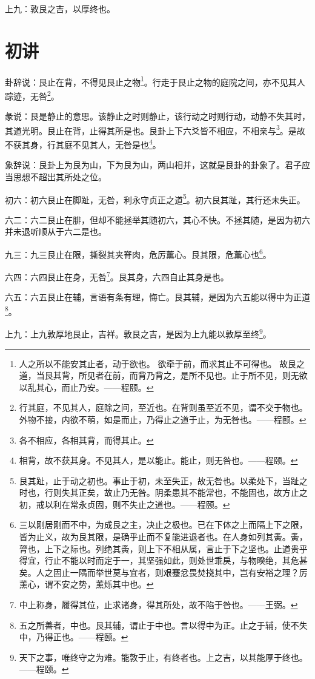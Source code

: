 \documentclass[12pt,oneside]{book}
\begin{document}
上九：敦艮之吉，以厚终也。

\section{初讲}
卦辞说：艮止在背，不得见艮止之物\footnote{人之所以不能安其止者，动于欲也。 欲牵于前，而求其止不可得也。 故艮之道，当艮其背，所见者在前，而背乃背之，是所不见也。止于所不见，则无欲以乱其心，而止乃安。——程颐。}。行走于艮止之物的庭院之间，亦不见其人踪迹，无咎\footnote{行其庭，不见其人，庭除之间，至近也。在背则虽至近不见，谓不交于物也。外物不接，内欲不萌，如是而止，乃得止之道于止，为无咎也。——程颐。}。

彖说：艮是静止的意思。该静止之时则静止，该行动之时则行动，动静不失其时，其道光明。艮止在背，止得其所是也。艮卦上下六爻皆不相应，不相亲与\footnote{各不相应，各相其背，而得其止。}。是故不获其身，行其庭不见其人，无咎是也\footnote{相背，故不获其身。不见其人，是以能止。能止，则无咎也。——程颐。}。

象辞说：艮卦上为艮为山，下为艮为山，两山相并，这就是艮卦的卦象了。君子应当思想不超出其所处之位。

初六：初六艮止在脚趾，无咎，利永守贞正之道\footnote{艮其趾，止于动之初也。事止于初，未至失正，故无咎也。以柔处下，当趾之时也，行则失其正矣，故止乃无咎。阴柔患其不能常也，不能固也，故方止之初，戒以利在常永贞固，则不失止之道也。——程颐。}。初六艮其趾，其行还未失正。

六二：六二艮止在腓，但却不能拯举其随初六，其心不快。不拯其随，是因为初六并未退听顺从于六二是也。

九三：九三艮止在限，撕裂其夹脊肉，危厉薰心。艮其限，危薰心也\footnote{三以刚居刚而不中，为成艮之主，决止之极也。已在下体之上而隔上下之限，皆为止义，故为艮其限，是确乎止而不复能进退者也。在人身如列其夤。夤，膂也，上下之际也。列绝其夤，则上下不相从属，言止于下之坚也。止道贵乎得宜，行止不能以时而定于一，其坚强如此，则处世乖戾，与物睽绝，其危甚矣。人之固止一隅而举世莫与宜者，则艰蹇忿畏焚挠其中，岂有安裕之理？厉薰心，谓不安之势，薰烁其中也。}。

六四：六四艮止在身，无咎\footnote{中上称身，履得其位，止求诸身，得其所处，故不陷于咎也。——王弼。}。艮其身，六四自止其身是也。

六五：六五艮止在辅，言语有条有理，悔亡。艮其辅，是因为六五能以得中为正道\footnote{五之所善者，中也。艮其辅，谓止于中也。言以得中为正。止之于辅，使不失中，乃得正也。——程颐。}。

上九：上九敦厚地艮止，吉祥。敦艮之吉，是因为上九能以敦厚至终\footnote{天下之事，唯终守之为难。能敦于止，有终者也。上之吉，以其能厚于终也。——程颐。}。
\end{document}
